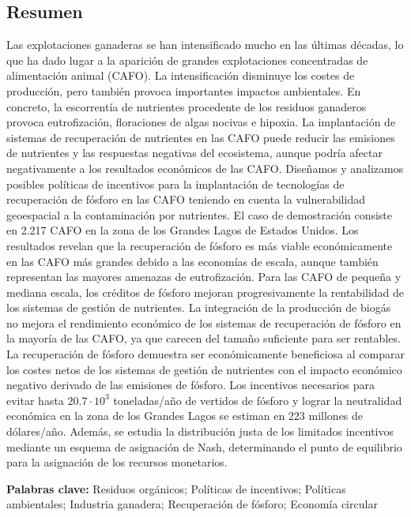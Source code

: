\begin{refsection}[referencesCh5]
\section*{Resumen}
Las explotaciones ganaderas se han intensificado mucho en las últimas décadas, lo que ha dado lugar a la aparición de grandes explotaciones concentradas de alimentación animal (CAFO). La intensificación disminuye los costes de producción, pero también provoca importantes impactos ambientales. En concreto, la escorrentía de nutrientes procedente de los residuos ganaderos provoca eutrofización, floraciones de algas nocivas e hipoxia. La implantación de sistemas de recuperación de nutrientes en las CAFO puede reducir las emisiones de nutrientes y las respuestas negativas del ecosistema, aunque podría afectar negativamente a los resultados económicos de las CAFO. Diseñamos y analizamos posibles políticas de incentivos para la implantación de tecnologías de recuperación de fósforo en las CAFO teniendo en cuenta la vulnerabilidad geoespacial a la contaminación por nutrientes. El caso de demostración consiste en 2.217 CAFO en la zona de los Grandes Lagos de Estados Unidos. Los resultados revelan que la recuperación de fósforo es más viable económicamente en las CAFO más grandes debido a las economías de escala, aunque también representan las mayores amenazas de eutrofización. Para las CAFO de pequeña y mediana escala, los créditos de fósforo mejoran progresivamente la rentabilidad de los sistemas de gestión de nutrientes. La integración de la producción de biogás no mejora el rendimiento económico de los sistemas de recuperación de fósforo en la mayoría de las CAFO, ya que carecen del tamaño suficiente para ser rentables. La recuperación de fósforo demuestra ser económicamente beneficiosa al comparar los costes netos de los sistemas de gestión de nutrientes con el impacto económico negativo derivado de las emisiones de fósforo. Los incentivos necesarios para evitar hasta $20.7 \cdot 10^3$ toneladas/año de vertidos de fósforo y lograr la neutralidad económica en la zona de los Grandes Lagos se estiman en 223 millones de dólares/año. Además, se estudia la distribución justa de los limitados incentivos mediante un esquema de asignación de Nash, determinando el punto de equilibrio para la asignación de los recursos monetarios.

\bigskip
\textbf{Palabras clave:} Residuos orgánicos; Políticas de incentivos; Políticas ambientales; Industria ganadera; Recuperación de fósforo; Economía circular
\newpage



\end{refsection}
